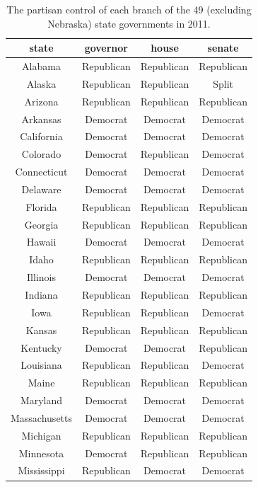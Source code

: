 \documentclass[]{book}
\theoremstyle{definition}
\theoremstyle{definition}
\theoremstyle{definition}
\theoremstyle{remark}
\begin{document}
\begin{enumerate}
\begin{table}
  \caption{\label{tab:govtcontroldata}The partisan control of each branch of the 49 (excluding Nebraska) state governments in 2011.}
  \centering
  \begin{tabular}[t]{c|c|c|c}
  \hline
  state & governor & house & senate\\
  \hline
  Alabama & Republican & Republican & Republican\\
  \hline
  Alaska & Republican & Republican & Split\\
  \hline
  Arizona & Republican & Republican & Republican\\
  \hline
  Arkansas & Democrat & Democrat & Democrat\\
  \hline
  California & Democrat & Democrat & Democrat\\
  \hline
  Colorado & Democrat & Republican & Democrat\\
  \hline
  Connecticut & Democrat & Democrat & Democrat\\
  \hline
  Delaware & Democrat & Democrat & Democrat\\
  \hline
  Florida & Republican & Republican & Republican\\
  \hline
  Georgia & Republican & Republican & Republican\\
  \hline
  Hawaii & Democrat & Democrat & Democrat\\
  \hline
  Idaho & Republican & Republican & Republican\\
  \hline
  Illinois & Democrat & Democrat & Democrat\\
  \hline
  Indiana & Republican & Republican & Republican\\
  \hline
  Iowa & Republican & Republican & Democrat\\
  \hline
  Kansas & Republican & Republican & Republican\\
  \hline
  Kentucky & Democrat & Democrat & Republican\\
  \hline
  Louisiana & Republican & Republican & Democrat\\
  \hline
  Maine & Republican & Republican & Republican\\
  \hline
  Maryland & Democrat & Democrat & Democrat\\
  \hline
  Massachusetts & Democrat & Democrat & Democrat\\
  \hline
  Michigan & Republican & Republican & Republican\\
  \hline
  Minnesota & Democrat & Republican & Republican\\
  \hline
  Mississippi & Republican & Democrat & Democrat\\

\end{tabular}
\end{table}
\end{enumerate}
\end{document}
